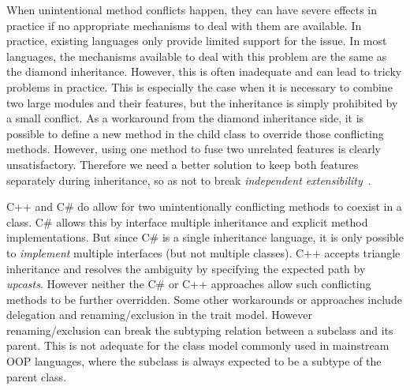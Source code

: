 
When unintentional method conflicts happen, they can have severe
effects in practice if no
appropriate mechanisms to deal with them are available. 
In practice, existing languages only provide limited support for
the issue. In most languages, the mechanisms available to deal with this problem are the same as the diamond
inheritance. However, this is often inadequate and can lead 
to tricky problems in practice. This is especially the case
when it is necessary to combine two large modules and their features,
but the inheritance is simply prohibited by a small conflict. 
As a workaround from the diamond inheritance side, it is possible to
define a new method in the child class to override those conflicting
methods. However, using one method to fuse two unrelated features
is clearly unsatisfactory. Therefore we need a better solution to keep both
features separately during inheritance, so as not to break
\emph{independent extensibility}~\cite{zenger05independentlyextensible}.

C++ and C\# do allow for two
unintentionally conflicting methods to coexist in a class. C\# allows
this by interface multiple inheritance and explicit method
implementations. But since C\# is a single inheritance language, 
it is only possible to \emph{implement} multiple interfaces (but not
multiple classes). %
C++ accepts triangle inheritance and
resolves the ambiguity by specifying the expected path by
\emph{upcasts}. However
neither the C\# or C++ approaches allow
such conflicting methods to be further overridden. 
Some other workarounds or approaches include delegation and
renaming/exclusion in the trait model. However renaming/exclusion 
can break the subtyping relation between a subclass and its parent.
This is not adequate for the class model commonly used in mainstream 
OOP languages, where the subclass is always expected to be a subtype 
of the parent class. 

